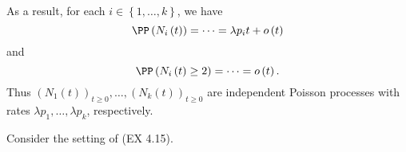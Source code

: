 \documentclass[stat333]{subfiles}
\begin{document}
\begin{subproof}
        As a result, for each $i\in\left\lbrace 1,\ldots,k \right\rbrace$, we have
        \begin{equation*}
            \PP\left( N_i\left( t \right) \right) = \cdots = \lambda p_it+o\left( t \right)
        \end{equation*}
        and
        \begin{equation*}
            \PP\left( N_i\left( t \right)\geq 2 \right) = \cdots = o\left( t \right).
        \end{equation*}
        Thus $\left( N_{1}\left( t \right) \right)^{}_{t\geq 0},\ldots,\left( N_{k}\left( t \right) \right)^{}_{t\geq 0}$ are independent Poisson processes with rates $\lambda p_1,\ldots,\lambda p_k$, respectively.
    \end{subproof}

    \ex Consider the setting of (EX 4.15).
\end{document}
